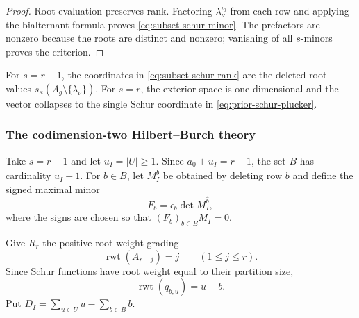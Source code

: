 \documentclass[10pt,fleqn]{article}
\numberwithin{equation}{section}
\newcommand{\rwt}{\operatorname{rwt}}
\begin{document}
\begin{proof}
Root evaluation preserves rank.  Factoring $\lambda_\nu^{i_0}$ from
each row and applying the bialternant formula proves
\eqref{eq:subset-schur-minor}.  The prefactors are nonzero because the
roots are distinct and nonzero; vanishing of all $s$-minors proves the criterion.
\end{proof}

For $s=r-1$, the coordinates in \eqref{eq:subset-schur-rank} are the deleted-root values
$s_{\kappa} (\Lambda_g\setminus\{\lambda_\nu\})$.  For $s=r$, the exterior space is
one-dimensional and the vector collapses to the single Schur coordinate in
\eqref{eq:prior-schur-plucker}.

\subsubsection{The codimension-two Hilbert--Burch theory}

Take $s=r-1$ and let $u_I=|U|\ge1$.  Since
$a_0+u_I=r-1$, the set $B$ has cardinality $u_I+1$.  For $b\in B$, let $M_I^{\widehat b}$
be obtained by deleting row $b$ and define the signed maximal minor
\begin{equation}\label{eq:Fb}
 F_b=\epsilon_b\det M_I^{\widehat b},
\end{equation}
where the signs are chosen so that $(F_b)_{b\in B}M_I=0$.

Give $R_r$ the positive root-weight grading
\begin{equation}\label{eq:root-weight}
 \rwt(A_{r-j})=j\qquad(1\le j\le r).
\end{equation}
Since Schur functions have root weight equal to their partition size,
\begin{equation}\label{eq:entry-weight}
 \rwt(q_{b,u})=u-b.
\end{equation}
Put $D_I=\sum_{u\in U}u-\sum_{b\in B}b$.
\end{document}
